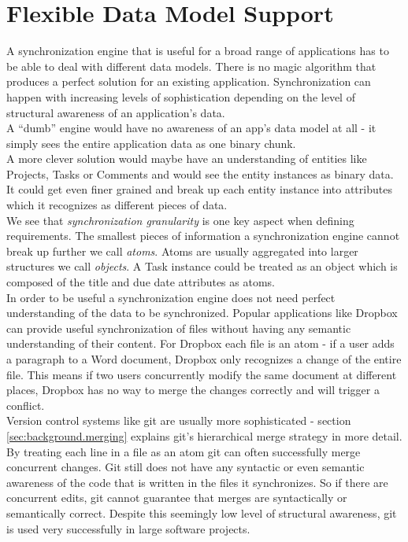 \section{Flexible Data Model Support}
\label{sec:requirements.data-models}
A synchronization engine that is useful for a broad range of applications has to be able to deal with different data models. There is no magic algorithm that produces a perfect solution for an existing application.
Synchronization can happen with increasing levels of sophistication depending on the level of structural awareness of an application's data.\\
A ``dumb'' engine would have no awareness of an app's data model at all - it simply sees the entire application data as one binary chunk.\\
A more clever solution would maybe have an understanding of entities like Projects, Tasks or Comments and would see the entity instances as binary data.\\
It could get even finer grained and break up each entity instance into attributes which it recognizes as different pieces of data.\\
We see that \emph{synchronization granularity} is one key aspect when defining requirements.
The smallest pieces of information a synchronization engine cannot break up further we call \emph{atoms}.
Atoms are usually aggregated into larger structures we call \emph{objects}.
A Task instance could be treated as an object which is composed of the title and due date attributes as atoms.\\
In order to be useful a synchronization engine does not need perfect understanding of the data to be synchronized.
Popular applications like Dropbox can provide useful synchronization of files without having any semantic understanding of their content.
For Dropbox each file is an atom - if a user adds a paragraph to a Word document, Dropbox only recognizes a change of the entire file.
This means if two users concurrently modify the same document at different places, Dropbox has no way to merge the changes correctly and will trigger a conflict.\\
Version control systems like git are usually more sophisticated - section \ref{sec:background.merging} explains git's hierarchical merge strategy in more detail.
By treating each line in a file as an atom git can often successfully merge concurrent changes.
Git still does not have any syntactic or even semantic awareness of the code that is written in the files it synchronizes.
So if there are concurrent edits, git cannot guarantee that merges are syntactically or semantically correct.
Despite this seemingly low level of structural awareness, git is used very successfully in large software projects.\\

